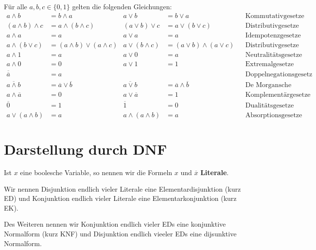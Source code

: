 \begin{prop}
	Für alle $a,b,c \in \{0,1\}$ gelten die folgenden Gleichungen: 
	{ \small 
		\begin{align*}
			a \wedge b & = b \wedge a &  a \vee b & = b \vee a & & \text{Kommutativgesetze} 
			\\ (a \wedge b) \wedge c & = a \wedge (b \wedge c) &  (a \vee b) \vee c& = a \vee (b \vee c) & & \text{Distributivgesetze} 
			\\ a \wedge a & = a  & a \vee a & = a  & & \text{Idempotenzgesetze} 
			\\ a \wedge (b \vee c) & = (a \wedge b) \vee (a \wedge c) &  a \vee (b \wedge c) & = (a \vee b) \wedge (a \vee c)  && \text{Distributivgesetze} 
			\\ a \wedge 1 & = a  & a \vee 0 & = a  & & \text{Neutralitätsgesetze} 
			\\ a \wedge 0 & = 0 &  a \vee 1 & = 1 & & \text{Extremalgesetze} 
			\\ \overline{\overline{a}} & = a & & & & \text{Doppelnegationsgesetz}			
			\\ \overline{a \wedge b} & = \overline{a} \vee \overline{b}  & \overline{a \vee b} & = \overline{a} \wedge \overline{b} & & \text{De Morgansche Gesetze} 
			\\ a \wedge \overline{a} & = 0  & a \vee \overline{a} & = 1 & & \text{Komplementärgesetze}
			\\ \overline{0} & = 1 & \overline{1} & = 0 & & \text{Dualitätsgesetze} 
			\\ a \vee (a \wedge b) & = a & a \wedge (a \wedge b) & = a & & \text{Absorptionsgesetze}
		\end{align*} 
	}
\end{prop} 





\section{Darstellung durch DNF} 

\begin{defn}
	Ist $x$ eine boolesche Variable, so nennen wir die Formeln $x$ und $\overline{x}$ \textbf{Literale}. 
	
	Wir nennen Disjunktion endlich vieler Literale eine Elementardisjunktion (kurz ED) und Konjunktion endlich vieler Literale eine Elementarkonjunktion (kurz EK). 
	
	Des Weiteren nennen wir Konjunktion endlich vieler EDs eine konjunktive Normalform (kurz KNF) und Disjunktion endlich vieeler EDs eine dijsunktive Normalform. 
\end{defn} 


